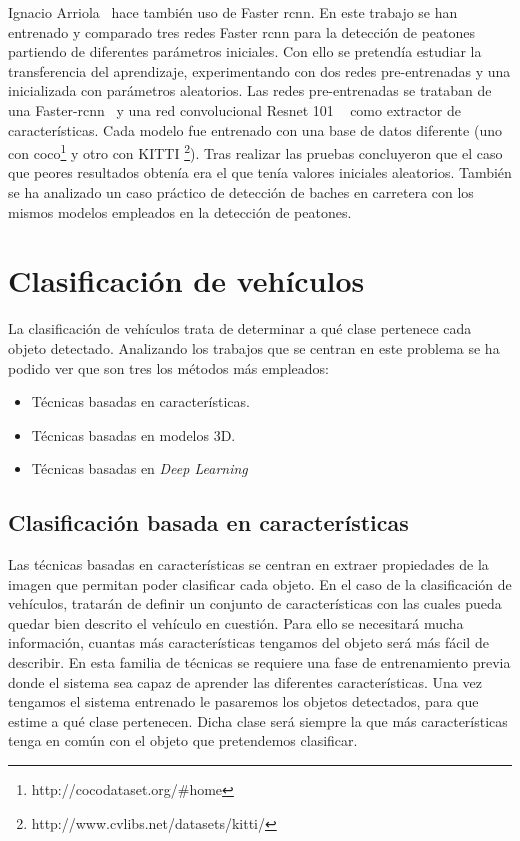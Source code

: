 Ignacio Arriola~\cite{tesis_ignacio_arriola} hace también uso de Faster \acrshort{rcnn}. En este trabajo se han entrenado y comparado tres redes Faster \acrshort{rcnn} para la detección de peatones partiendo de diferentes parámetros iniciales. Con ello se pretendía estudiar la transferencia del aprendizaje, experimentando con dos redes pre-entrenadas y una inicializada con parámetros aleatorios.  Las redes pre-entrenadas se trataban de una Faster-\acrshort{rcnn}~\cite{faster_rcnn_ignacio} y una red convolucional Resnet 101 ~\cite{faster_rcnn_regnet_ignacio} como extractor de características. Cada modelo fue entrenado con una base de datos diferente (uno con \acrfull{coco}\footnote{http://cocodataset.org/\#home} y otro con KITTI \footnote{http://www.cvlibs.net/datasets/kitti/}). Tras realizar las pruebas concluyeron que el caso que peores resultados obtenía era el que tenía valores iniciales aleatorios. También se ha analizado un caso práctico de detección de baches en carretera con los mismos modelos empleados en la detección de peatones.


\section{Clasificación de vehículos}

La clasificación de vehículos trata de determinar a qué clase pertenece cada objeto detectado. Analizando los trabajos que se centran en este problema se ha podido ver que son tres los métodos más empleados:
\begin{itemize}
    \item Técnicas basadas en características.
    \item Técnicas basadas en modelos 3D.
    \item Técnicas basadas en \textit{Deep Learning}
\end{itemize}

\subsection{Clasificación basada en características}
Las técnicas basadas en características se centran en extraer propiedades de la imagen que permitan poder clasificar cada objeto. En el caso de la clasificación de vehículos, tratarán de definir un conjunto de características con las cuales pueda quedar bien descrito el vehículo en cuestión. Para ello se necesitará mucha información, cuantas más características tengamos del objeto será más fácil de describir. En esta familia de técnicas se requiere una fase de entrenamiento previa donde el sistema sea capaz de aprender las diferentes características. Una vez tengamos el sistema entrenado le pasaremos los objetos detectados, para que estime a qué clase pertenecen. Dicha clase será siempre la que más características tenga en común con el objeto que pretendemos clasificar.
 
